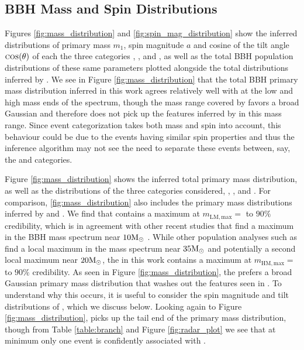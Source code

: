 \subsection{BBH Mass and Spin Distributions}

Figures \ref{fig:mass_distribution} and \ref{fig:spin_mag_distribution} show the inferred distributions of primary mass $m_1$, spin magnitude $a$ and cosine of the tilt angle $\textsc{cos}(\theta)$ of each the three categories \first{}, \second{}, and \cont{}, as well as the total BBH population distributions of these same parameters plotted alongside the total distributions inferred by . We see in Figure \ref{fig:mass_distribution} that the total BBH primary mass distribution inferred in this work agrees relatively well with  at the low and high mass ends of the spectrum, though the mass range covered by \second{} favors a broad Gaussian and therefore does not pick up the features inferred by  in this mass range. Since event categorization takes both mass and spin into account, this behaviour could be due to the \second{} events having similar spin properties and thus the inference algorithm may not see the need to separate these events between, say, the \second{} and \cont{} categories. 

Figure \ref{fig:mass_distribution} shows the inferred total primary mass distribution, as well as the distributions of the three categories considered, \first{}, \second{}, and \cont{}. For comparison, \ref{fig:mass_distribution} also includes the primary mass distributions inferred by  and . We find that \first{} contains a maximum at $m_\mathrm{LM,max} = $ \result{$\CIPlusMinus{\macros[Mass][LowMassPeak][max]}\msun$}  to $90\%$ credibility, which is in agreement with other recent studies that find a maximum in the BBH mass spectrum near $10 {\rm M}_\odot$ . While other population analyses such as  find a local maximum in the mass spectrum near $35{\rm M}_\odot$ and potentially a second local maximum near $20{\rm M}_\odot$, the \second{} in this work contains a maximum at $m_\mathrm{HM,max} = $ \result{$\CIPlusMinus{\macros[Mass][HighMassPeak][max]}\msun$}  to $90\%$ credibility. As seen in Figure \ref{fig:mass_distribution}, the \second{} prefers a broad Gaussian primary mass distribution that washes out the features seen in . To understand why this occurs, it is useful to consider the spin magnitude and tilt distributions of \second{}, which we discuss below. Looking again to Figure \ref{fig:mass_distribution}, \cont{} picks up the tail end of the primary mass distribution, though from Table \ref{table:branch} and Figure \ref{fig:radar_plot} we see that at minimum only one event is confidently associated with \cont{}. 

